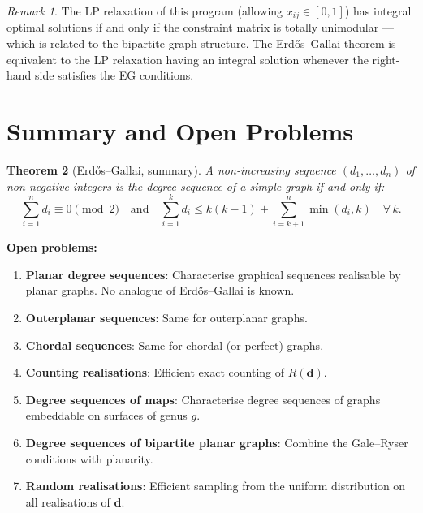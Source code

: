 \documentclass[12pt,a4paper]{amsart}
\newtheorem{theorem}{Theorem}[section]
\theoremstyle{definition}
\theoremstyle{remark}
\newtheorem{remark}[theorem]{Remark}
\begin{document}
\begin{remark}
The LP relaxation of this program (allowing $x_{ij} \in [0,1]$) has integral
optimal solutions if and only if the constraint matrix is totally unimodular ---
which is related to the bipartite graph structure.
The Erd\H{o}s--Gallai theorem is equivalent to the LP relaxation having an
integral solution whenever the right-hand side satisfies the EG conditions.
\end{remark}

\section{Summary and Open Problems}

\begin{theorem}[Erd\H{o}s--Gallai, summary]
A non-increasing sequence $(d_1, \ldots, d_n)$ of non-negative integers is the
degree sequence of a simple graph if and only if:
\[
  \sum_{i=1}^n d_i \equiv 0 \pmod{2}
  \quad \text{and} \quad
  \sum_{i=1}^k d_i \leq k(k-1) + \sum_{i=k+1}^n \min(d_i, k)
  \quad \forall\, k.
\]
\end{theorem}

\noindent\textbf{Open problems:}
\begin{enumerate}[label=(\arabic*)]
  \item \textbf{Planar degree sequences}: Characterise graphical sequences
        realisable by planar graphs. No analogue of Erd\H{o}s--Gallai is known.
  \item \textbf{Outerplanar sequences}: Same for outerplanar graphs.
  \item \textbf{Chordal sequences}: Same for chordal (or perfect) graphs.
  \item \textbf{Counting realisations}: Efficient exact counting of $R(\mathbf{d})$.
  \item \textbf{Degree sequences of maps}: Characterise degree sequences of
        graphs embeddable on surfaces of genus $g$.
  \item \textbf{Degree sequences of bipartite planar graphs}: Combine the
        Gale--Ryser conditions with planarity.
  \item \textbf{Random realisations}: Efficient sampling from the uniform
        distribution on all realisations of $\mathbf{d}$.
\end{enumerate}

\end{document}
